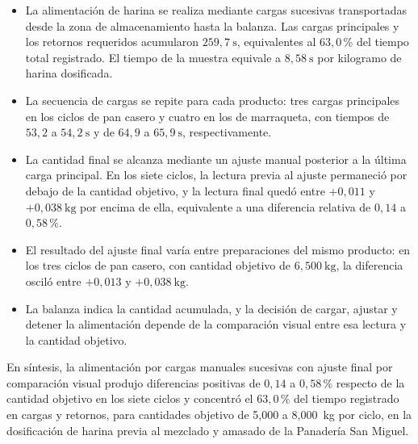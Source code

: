 \begin{itemize}

    \item La alimentación de harina se realiza mediante cargas sucesivas
    transportadas desde la zona de almacenamiento hasta la balanza. Las
    cargas principales y los retornos requeridos acumularon
    $259{,}7\ \mathrm{s}$, equivalentes al $63{,}0$\,\% del tiempo total
    registrado. El tiempo de la muestra equivale a
    $8{,}58\ \mathrm{s}$ por kilogramo de harina dosificada.

    \item La secuencia de cargas se repite para cada producto: tres cargas
    principales en los ciclos de pan casero y cuatro en los de marraqueta,
    con tiempos de $53{,}2$ a $54{,}2\ \mathrm{s}$ y de $64{,}9$ a
    $65{,}9\ \mathrm{s}$, respectivamente.

    \item La cantidad final se alcanza mediante un ajuste manual posterior a
    la última carga principal. En los siete ciclos, la lectura previa al
    ajuste permaneció por debajo de la cantidad objetivo, y la lectura final
    quedó entre $+0{,}011$ y $+0{,}038\ \mathrm{kg}$ por encima de ella,
    equivalente a una diferencia relativa de $0{,}14$ a $0{,}58$\,\%.

    \item El resultado del ajuste final varía entre preparaciones del mismo
    producto: en los tres ciclos de pan casero, con cantidad objetivo de
    $6{,}500\ \mathrm{kg}$, la diferencia osciló entre $+0{,}013$ y
    $+0{,}038\ \mathrm{kg}$.

    \item La balanza indica la cantidad acumulada, y la decisión de cargar,
    ajustar y detener la alimentación depende de la comparación visual entre
    esa lectura y la cantidad objetivo.

\end{itemize}

En síntesis, la alimentación por cargas manuales sucesivas con ajuste final
por comparación visual produjo diferencias positivas de $0{,}14$ a
$0{,}58$\,\% respecto de la cantidad objetivo en los siete ciclos y
concentró el $63{,}0$\,\% del tiempo registrado en cargas y retornos, para
cantidades objetivo de 5,000 a 8,000~kg por ciclo, en la dosificación de
harina previa al mezclado y amasado de la Panadería San Miguel.

